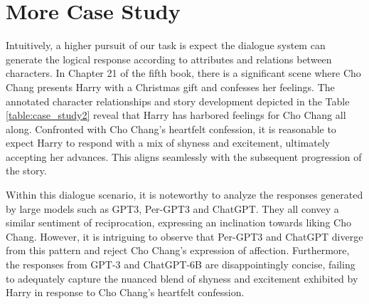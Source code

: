 \documentclass[11pt]{article}
\begin{document}
\section{More Case Study}
\label{case2}
Intuitively, a higher pursuit of our task is expect the dialogue system can generate the  logical response according to  attributes and relations between characters. 
In Chapter 21 of the fifth book, there is a significant scene where Cho Chang presents Harry with a Christmas gift and confesses her feelings. The annotated character relationships and story development depicted in the Table \ref{table:case_study2} reveal that Harry has harbored feelings for Cho Chang all along. Confronted with Cho Chang's heartfelt confession, it is reasonable to expect Harry to respond with a mix of shyness and excitement, ultimately accepting her advances. This aligns seamlessly with the subsequent progression of the story.

Within this dialogue scenario, it is noteworthy to analyze the responses generated by large models such as GPT3, Per-GPT3 and ChatGPT. They all convey a similar sentiment of reciprocation, expressing an inclination towards liking Cho Chang. However, it is intriguing to observe that Per-GPT3 and ChatGPT diverge from this pattern and reject Cho Chang's expression of affection. Furthermore, the responses from GPT-3 and ChatGPT-6B are disappointingly concise, failing to adequately capture the nuanced blend of shyness and excitement exhibited by Harry in response to Cho Chang's heartfelt confession.
\end{document}

